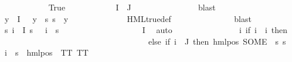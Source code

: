 \begin{isabellebody}
\ \ \ \ \ \ \ \ \ \ \isamarkupfalse%
\ True\isanewline
\ \ \ \ \ \ \ \ \ \ \isamarkupfalse%
\ {\isachardoublequoteopen}I\ {\isasyminter}\ J\ {\isacharequal}{\kern0pt}\ {\isacharbraceleft}{\kern0pt}{\isacharbraceright}{\kern0pt}{\isachardoublequoteclose}\isanewline
\ \ \ \ \ \ \ \ \ \ \ \ \isamarkupfalse%
\ blast\isanewline
\ \ \ \ \ \ \ \ \ \ \isamarkupfalse%
\ {}\ \isamarkupfalse%
\ {\isachardoublequoteopen}{\isasymforall}y{\isasymin}{\isasymPhi}\ {\isacharbackquote}{\kern0pt}\ I{\isachardot}{\kern0pt}\ {\isasymphi}\ {\isasymnoteq}\ y\ {\isasymlongrightarrow}\ {\isacharparenleft}{\kern0pt}{\isasymforall}s{\isachardot}{\kern0pt}\ s\ {\isasymTurnstile}\ y{\isacharparenright}{\kern0pt}{\isachardoublequoteclose}\isanewline
\ \ \ \ \ \ \ \ \ \ \ \ \isamarkupfalse%
\ HML{\isacharunderscore}{\kern0pt}true{\isacharunderscore}{\kern0pt}def\ \isanewline
\ \ \ \ \ \ \ \ \ \ \ \ \isamarkupfalse%
\ blast\isanewline
\ \ \ \ \ \ \ \ \ \ \isamarkupfalse%
\ {\isachardoublequoteopen}{\isasymforall}s{\isachardot}{\kern0pt}\ {\isacharparenleft}{\kern0pt}{\isasymforall}i\ {\isasymin}\ I{\isachardot}{\kern0pt}\ s\ {\isasymTurnstile}\ {\isacharparenleft}{\kern0pt}{\isasymPhi}\ i{\isacharparenright}{\kern0pt}{\isacharparenright}{\kern0pt}\ {\isasymlongleftrightarrow}\ s\ {\isasymTurnstile}\ {\isasymphi}{\isachardoublequoteclose}\isanewline
\ \ \ \ \ \ \ \ \ \ \ \ \isamarkupfalse%
\ {\isacartoucheopen}{\isasymphi}\ {\isasymin}\ {\isasymPhi}\ {\isacharbackquote}{\kern0pt}\ I{\isacartoucheclose}\ \isamarkupfalse%
\ auto\isanewline
\ \ \ \ \ \ \ \ \ \ \isamarkupfalse%
\ {\isasymPsi}\ \ {\isachardoublequoteopen}{\isasymPsi}\ {\isasymequiv}\ {\isacharparenleft}{\kern0pt}{\isasymlambda}i{\isachardot}{\kern0pt}\ {\isacharparenleft}{\kern0pt}if\ i\ {\isacharequal}{\kern0pt}\ i{\isacharunderscore}{\kern0pt}{\isasymphi}\ then\ {\isasympsi}\ \isanewline
\ \ \ \ \ \ \ \ \ \ \ \ \ \ \ \ \ \ \ \ \ \ \ \ \ \ \ \ \ \ \ \ \ \ \ \ else\ {\isacharparenleft}{\kern0pt}if\ i\ {\isasymin}\ J\ then\ {\isacharparenleft}{\kern0pt}hml{\isacharunderscore}{\kern0pt}pos\ {\isacharparenleft}{\kern0pt}SOME\ {\isasymalpha}{\isachardot}{\kern0pt}\ {\isacharparenleft}{\kern0pt}{\isasymforall}s{\isachardot}{\kern0pt}\ {\isacharparenleft}{\kern0pt}s\ {\isasymTurnstile}\ {\isasymPhi}\ i{\isacharparenright}{\kern0pt}\ {\isasymlongleftrightarrow}\ {\isacharparenleft}{\kern0pt}s\ {\isasymTurnstile}\ {\isacharparenleft}{\kern0pt}hml{\isacharunderscore}{\kern0pt}pos\ {\isasymalpha}\ TT{\isacharparenright}{\kern0pt}{\isacharparenright}{\kern0pt}{\isacharparenright}{\kern0pt}{\isacharparenright}{\kern0pt}\ TT{\isacharparenright}{\kern0pt}\ \ \isanewline

\end{isabellebody}
